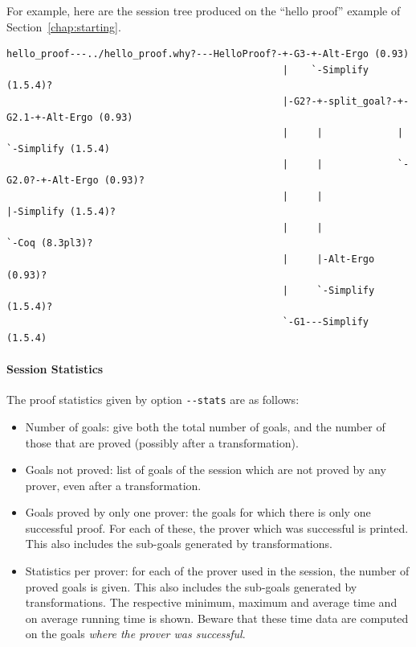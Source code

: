 For example, here are the session tree produced on the ``hello
proof'' example of Section~\ref{chap:starting}.
{\scriptsize
\begin{verbatim}
hello_proof---../hello_proof.why?---HelloProof?-+-G3-+-Alt-Ergo (0.93)
                                                |    `-Simplify (1.5.4)?
                                                |-G2?-+-split_goal?-+-G2.1-+-Alt-Ergo (0.93)
                                                |     |             |      `-Simplify (1.5.4)
                                                |     |             `-G2.0?-+-Alt-Ergo (0.93)?
                                                |     |                     |-Simplify (1.5.4)?
                                                |     |                     `-Coq (8.3pl3)?
                                                |     |-Alt-Ergo (0.93)?
                                                |     `-Simplify (1.5.4)?
                                                `-G1---Simplify (1.5.4)
\end{verbatim}
}

\paragraph{Session Statistics}

The proof statistics given by option \verb|--stats| are as follows:
\begin{itemize}
\item Number of goals: give both the total number of goals, and the
  number of those that are proved (possibly after a transformation).
\item Goals not proved: list of goals of the session which are not
  proved by any prover, even after a transformation.
\item Goals proved by only one prover: the goals for which there is only
  one successful proof. For each of these, the prover which was
  successful is printed. This also includes the sub-goals generated by
  transformations.
\item Statistics per prover: for each of the prover used in the
  session, the number of proved goals is given. This also includes the
  sub-goals generated by transformations. The respective minimum,
  maximum and average time and on average running time is
  shown. Beware that these time data are computed on the
  goals \emph{where the prover was successful}.
\end{itemize}

